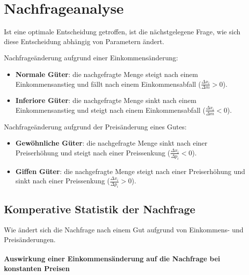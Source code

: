 \chapter{Nachfrageanalyse}

Ist eine optimale Entscheidung getroffen, ist die nächstgelegene Frage, wie sich diese Entscheidung abhängig von Parametern ändert. ~\bigskip

Nachfrageänderung aufgrund einer Einkommensänderung:
\begin{itemize}
	\item \textbf{Normale Güter}: die nachgefragte Menge steigt nach einem Einkommensanstieg und fällt nach einem Einkommensabfall ($\frac{\Delta x_i}{\Delta m} > 0$).
	\item \textbf{Inferiore Güter}: die nachgefragte Menge sinkt nach einem Einkommensanstieg und steigt nach einem Einkommensabfall ($\frac{\Delta x_i}{\Delta m} < 0$).
\end{itemize}

Nachfrageänderung aufgrund der Preisänderung eines Gutes:
\begin{itemize}
	\item \textbf{Gewöhnliche Güter}: die nachgefragte Menge sinkt nach einer Preiserhöhung und steigt nach einer Preissenkung ($\frac{\Delta x_i}{\Delta p_i} < 0$).
	\item \textbf{Giffen Güter}: die nachgefragte Menge steigt nach einer Preiserhöhung und sinkt nach einer Preissenkung ($\frac{\Delta x_i}{\Delta p_i} > 0$).
\end{itemize}

\section{Komperative Statistik der Nachfrage}

Wie ändert sich die Nachfrage nach einem Gut aufgrund von Einkommens- und Preisänderungen.

\subsubsection*{Auswirkung einer Einkommensänderung auf die Nachfrage bei konstanten Preisen}

